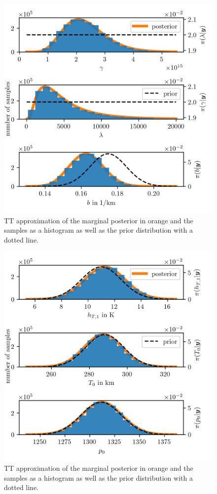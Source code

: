 \begin{figure}[ht!]
	\centering
	\includegraphics{PHdPTPost0.png}
	\caption[Histograms and TT approximation of posterior distribution as well as hyper-prior distribution.]{TT approximation of the marginal posterior in orange and the samples as a histogram as well as the prior distribution with a dotted line.}
	\label{fig:PostHistTT0}
\end{figure}
\begin{figure}[ht!]
	\centering
	\includegraphics{PHdPTPost1.png}
	\caption[Histograms and TT approximation of posterior distribution as well as hyper-prior distribution.]{TT approximation of the marginal posterior in orange and the samples as a histogram as well as the prior distribution with a dotted line.}
	\label{fig:PostHistTT1}
\end{figure}
